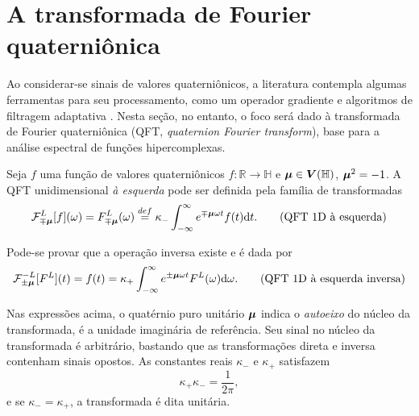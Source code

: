\section{A transformada de Fourier quaterni\^onica}
\label{sec:QFT}

Ao considerar-se sinais de valores quaterni\^onicos, a literatura contempla algumas ferramentas para seu processamento, como um operador gradiente \cite{jiang2014general} e algoritmos de filtragem adaptativa \cite{jiang2013frequency}. Nesta se\c c\~ao, no entanto, o foco ser\'a dado \`a transformada de Fourier quaterni\^onica (QFT, \emph{quaternion Fourier transform}), base para a an\'alise espectral de fun\c c\~oes hipercomplexas.

Seja $f$ uma fun\c c\~ao de valores quaterni\^onicos $f: \mathbb{R} \rightarrow \mathbb{H}$ e $\boldsymbol{\mu} \in \boldsymbol{V}(\mathbb{H})$, $\boldsymbol{\mu}^2 = -1$. A QFT unidimensional \emph{\`a esquerda} pode ser definida pela fam\'ilia de transformadas
\begin{equation}
\mathcal{F}^L_{\mp \boldsymbol{\mu}}[f](\omega) = 
F^L_{\mp \boldsymbol{\mu}}(\omega) \overset{def}{=}
\kappa_{-} \int_{-\infty}^{\infty} e^{\mp \boldsymbol{\mu} \omega t} f(t) \mathrm{d}t.
\tag{QFT 1D \`a esquerda}
\end{equation}

Pode-se provar que a opera\c c\~ao inversa existe e \'e dada por
\begin{equation}
\mathcal{F}^{-L}_{\pm \boldsymbol{\mu}}[F^L](t) = 
f(t) =
\kappa_{+} \int_{-\infty}^{\infty} e^{\pm \boldsymbol{\mu} \omega t} F^L(\omega) \mathrm{d}\omega.
\tag{QFT 1D \`a esquerda inversa}
\end{equation}

Nas express\~oes acima, o quat\'ernio puro unit\'ario $\boldsymbol{\mu}$ indica o \emph{autoeixo} do n\'ucleo da transformada, \'e a unidade imagin\'aria de refer\^encia. Seu sinal no n\'ucleo da transformada \'e arbitr\'ario, bastando que as transforma\c c\~oes direta e inversa contenham sinais opostos. As constantes reais $\kappa_{-}$ e $\kappa_{+}$ satisfazem
\begin{equation}
\kappa_{+} \kappa_{-} = \frac{1}{2\pi},
\end{equation}
\noindent e se $\kappa_{-} = \kappa_{+}$, a transformada \'e dita unit\'aria.

